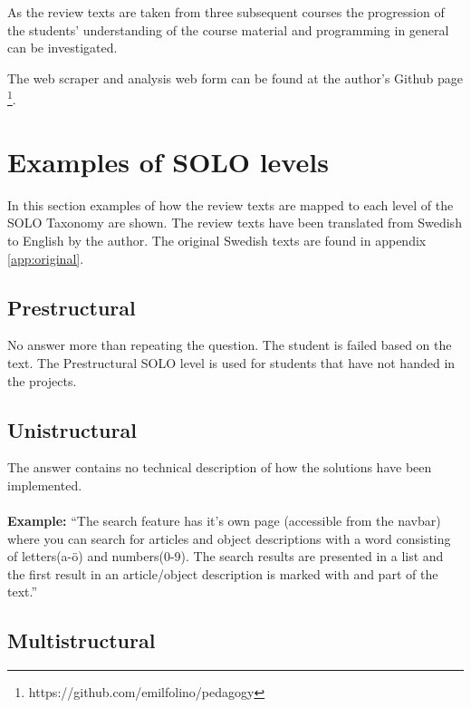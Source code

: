 \documentclass[twoside,twocolumn,a4paper,11pt,english]{article}
\begin{document}
As the review texts are taken from three subsequent courses the progression of the students' understanding of the course material and programming in general can be investigated.

The web scraper and analysis web form can be found at the author's Github page \footnote{https://github.com/emilfolino/pedagogy}.




\section{Examples of SOLO levels} \label{sec:examples}

In this section examples of how the review texts are mapped to each level of the SOLO Taxonomy are shown. The review texts have been translated from Swedish to English by the author. The original Swedish texts are found in appendix \ref{app:original}.

\subsection{Prestructural}

No answer more than repeating the question. The student is failed based on the text. The Prestructural SOLO level is used for students that have not handed in the projects.

\subsection{Unistructural}

The answer contains no technical description of how the solutions have been implemented.
\\
\\
\textbf{Example:} ``The search feature has it's own page (accessible from the navbar) where you can search for articles and object descriptions with a word consisting of letters(a-ö) and numbers(0-9). The search results are presented in a list and the first result in an article/object description is marked with and part of the text.''

\subsection{Multistructural}
\end{document}
